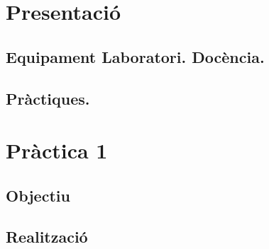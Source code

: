



    



\tableofcontents

\chapter{Presentació}



\section{Equipament Laboratori. Docència.}


\section{Pràctiques.}


\newpage


\chapter{Pràctica 1}

\section{Objectiu}


\section{Realització}



